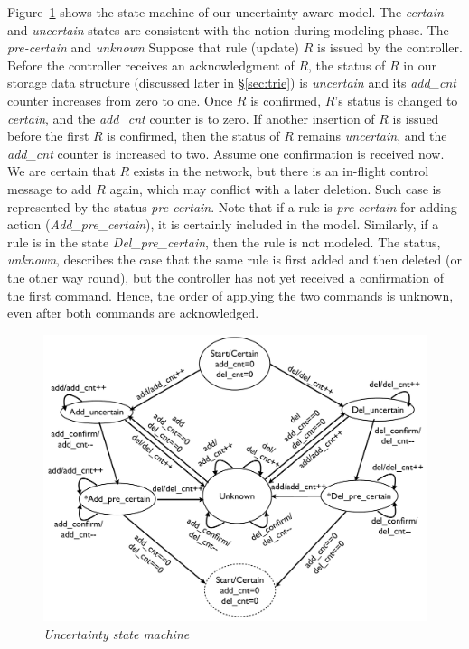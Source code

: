 Figure~\ref{fig:statemachine} shows the state machine of our uncertainty-aware
model. The \emph{certain} and \emph{uncertain} states are consistent
with the notion during modeling phase. The \emph{pre-certain} and
\emph{unknown}  Suppose that rule (update) $R$ is issued by the
controller. Before the controller receives an acknowledgment of $R$, the
status of $R$ in our  storage data structure (discussed later in
\S\ref{sec:trie}) is \emph{uncertain} and its \emph{add\_cnt} counter increases
from zero to one.  Once $R$ is confirmed, %
$R$'s status is changed to \emph{certain}, and the \emph{add\_cnt}
counter is  to zero.  If another insertion of $R$ is issued
before the first $R$ is confirmed, then the status of $R$ remains
\emph{uncertain}, and the \emph{add\_cnt} counter is increased to two. Assume
one confirmation is received now. We are certain that $R$ exists in the
network, but there is an in-flight control message to add $R$ again, which may
conflict with a later deletion.  Such case is represented by the status
\emph{pre-certain}. Note that if a rule is \emph{pre-certain} for adding action
(\emph{Add\_pre\_certain}), it is certainly included in the model. Similarly,
if a rule is in the state \emph{Del\_pre\_certain}, then the rule is not
modeled.  The status, \emph{unknown}, describes the case that the same rule is
first added and then deleted (or the other way round), but the controller has
not yet received a confirmation of the first command. Hence, the order of applying the two  commands
is unknown, even after both commands are acknowledged.

\begin{figure}[!ht]
  \centering
  \includegraphics[width=\columnwidth]{figs/statemachine}
  \vspace{-0.3in}
  \caption{\em Uncertainty state machine}
  \label{fig:statemachine}
\end{figure}

